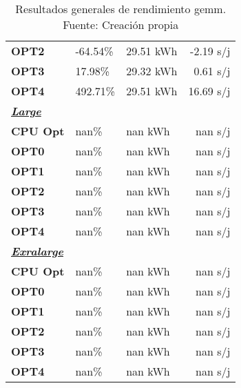 \begin{table}[H]
\begin{tabular}{lllr}
    \cellcolor[HTML]{DAE8FC} \textbf{OPT2} & -64.54\%  &	29.51 kWh  &	-2.19 s/j \\
    \rowcolor[HTML]{EFEFEF} \cellcolor[HTML]{DAE8FC} \textbf{OPT3} &17.98\%  &	29.32 kWh  &	0.61 s/j \\
    \cellcolor[HTML]{DAE8FC} \textbf{OPT4} & 492.71\%  &	29.51 kWh  &	16.69 s/j \\
    \rowcolor[HTML]{EFEFEF} \cellcolor[HTML]{DAE8FC} \textbf{\textbf{{\emph{{\underline{{Large}}}}}}} &&	&	 \\
    \cellcolor[HTML]{DAE8FC} \textbf{CPU Opt} & nan\%  &	nan kWh  &	nan s/j \\
    \rowcolor[HTML]{EFEFEF} \cellcolor[HTML]{DAE8FC} \textbf{OPT0} &nan\%  &	nan kWh  &	nan s/j \\
    \cellcolor[HTML]{DAE8FC} \textbf{OPT1} & nan\%  &	nan kWh  &	nan s/j \\
    \rowcolor[HTML]{EFEFEF} \cellcolor[HTML]{DAE8FC} \textbf{OPT2} &nan\%  &	nan kWh  &	nan s/j \\
    \cellcolor[HTML]{DAE8FC} \textbf{OPT3} & nan\%  &	nan kWh  &	nan s/j \\
    \rowcolor[HTML]{EFEFEF} \cellcolor[HTML]{DAE8FC} \textbf{OPT4} &nan\%  &	nan kWh  &	nan s/j \\
    \cellcolor[HTML]{DAE8FC} \textbf{\textbf{{\emph{{\underline{{Exralarge}}}}}}} & &	&	 \\
    \rowcolor[HTML]{EFEFEF} \cellcolor[HTML]{DAE8FC} \textbf{CPU Opt} &nan\%  &	nan kWh  &	nan s/j \\
    \cellcolor[HTML]{DAE8FC} \textbf{OPT0} & nan\%  &	nan kWh  &	nan s/j \\
    \rowcolor[HTML]{EFEFEF} \cellcolor[HTML]{DAE8FC} \textbf{OPT1} &nan\%  &	nan kWh  &	nan s/j \\
    \cellcolor[HTML]{DAE8FC} \textbf{OPT2} & nan\%  &	nan kWh  &	nan s/j \\
    \rowcolor[HTML]{EFEFEF} \cellcolor[HTML]{DAE8FC} \textbf{OPT3} &nan\%  &	nan kWh  &	nan s/j \\
    \cellcolor[HTML]{DAE8FC} \textbf{OPT4} & nan\%  &	nan kWh  &	nan s/j \\
    \end{tabular}
    \caption[Resultados generales de rendimiento gemm]{{Resultados generales de rendimiento gemm. Fuente: Creación propia}}
    \label{table_global_gemm_PowerResults_speedup-energy}
\end{table}